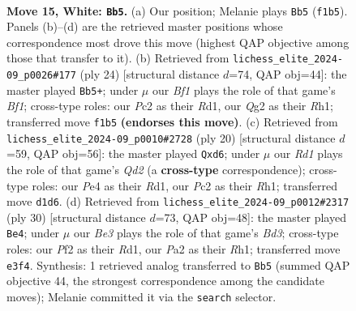 \documentclass[11pt]{article}
\begin{document}
\clearpage

\begin{figure}[p]\centering
\begin{subfigure}{0.46\textwidth}\centering
\resizebox{\linewidth}{!}{%
\newchessgame
\chessboard[
  setfen={rn1k3r/ppqbp1bp/3p2p1/4p1Pn/4P3/2N1B3/PPP2PQP/2KR1BR1 w - - 5 15},
  showmover=false,
  pgfstyle=straightmove, color=movearrow, markmove={f1-b5}
]}
\caption{}
\end{subfigure}\hfill
\begin{subfigure}{0.46\textwidth}\centering
\resizebox{\linewidth}{!}{%
\newchessgame
\chessboard[
  setfen={r1bqk2r/p3npbp/6p1/3pp1Pn/8/2N1BP2/PPPQ3P/2KR1BNR w kq - 0 13},
  showmover=false,
  pgfstyle=straightmove, color=movearrow, markmove={f1-b5}
]}
\caption{}
\end{subfigure}
\\[4pt]
\begin{subfigure}{0.46\textwidth}\centering
\resizebox{\linewidth}{!}{%
\newchessgame
\chessboard[
  setfen={r1bq1rk1/p4pbp/2pp1np1/4p3/4P3/2N1BP2/PPPQ2PP/2KR1B1R w - - 0 11},
  showmover=false,
  pgfstyle=straightmove, color=movearrow, markmove={d2-d6}
]}
\caption{}
\end{subfigure}\hfill
\begin{subfigure}{0.46\textwidth}\centering
\resizebox{\linewidth}{!}{%
\newchessgame
\chessboard[
  setfen={r1bqrnk1/2b2pp1/p1p2p2/1pP5/3P3p/3BB2P/PPQ1NPP1/1K1R3R w - - 1 16},
  showmover=false,
  pgfstyle=straightmove, color=movearrow, markmove={d3-e4}
]}
\caption{}
\end{subfigure}
\caption{\textbf{Move 15, White: \texttt{Bb5}.} (a) Our position; Melanie plays \texttt{Bb5} (\texttt{f1b5}). Panels (b)--(d) are the retrieved master positions whose correspondence most drove this move (highest QAP objective among those that transfer to it). (b) Retrieved from \texttt{lichess\_elite\_2024-09\_p0026\#177} (ply 24) [structural distance $d$=74, QAP obj=44]: the master played \texttt{Bb5+}; under $\mu$ our \emph{Bf1} plays the role of that game's \emph{Bf1}; cross-type roles: our \emph{P}c2 as their \emph{R}d1, our \emph{Q}g2 as their \emph{R}h1; transferred move \texttt{f1b5} \textbf{(endorses this move)}. (c) Retrieved from \texttt{lichess\_elite\_2024-09\_p0010\#2728} (ply 20) [structural distance $d$=59, QAP obj=56]: the master played \texttt{Qxd6}; under $\mu$ our \emph{Rd1} plays the role of that game's \emph{Qd2} (a \textbf{cross-type} correspondence); cross-type roles: our \emph{P}e4 as their \emph{R}d1, our \emph{P}c2 as their \emph{R}h1; transferred move \texttt{d1d6}. (d) Retrieved from \texttt{lichess\_elite\_2024-09\_p0012\#2317} (ply 30) [structural distance $d$=73, QAP obj=48]: the master played \texttt{Be4}; under $\mu$ our \emph{Be3} plays the role of that game's \emph{Bd3}; cross-type roles: our \emph{P}f2 as their \emph{R}d1, our \emph{P}a2 as their \emph{R}h1; transferred move \texttt{e3f4}. Synthesis: 1 retrieved analog transferred to \texttt{Bb5} (summed QAP objective 44, the strongest correspondence among the candidate moves); Melanie committed it via the \texttt{search} selector.}
\label{fig:thought-m28}
\end{figure}
\end{document}
